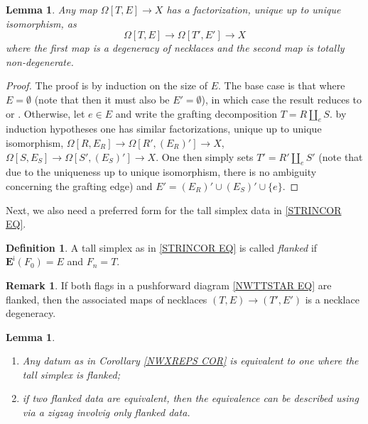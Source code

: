 \documentclass[a4paper,10pt
,draft
]{article}%
\numberwithin{equation}{section}
\numberwithin{figure}{section}
\newtheorem{lemma}[equation]{Lemma}%
\theoremstyle{definition} %
\newtheorem{definition}[equation]{Definition}%
\newtheorem{remark}[equation]{Remark}%
\newcommand{\1}{\ensuremath{\mathbbm 1}}%
\begin{document}
\begin{lemma}\label{DEGNECK LEM}
	Any map 
	$\Omega[T,E] \to X$
	has a factorization, unique up to unique isomorphism, as
\[
	\Omega[T,E] \to \Omega[T',E'] \to X
\]
where the first map is a degeneracy of necklaces
and the second map is totally non-degenerate.
\end{lemma}


\begin{proof}
	The proof is by induction on the size of $E$.
	The base case is that where $E = \emptyset$
	(note that then it must also be $E'=\emptyset$),
	in which case the result reduces to 
	\cite[Prop. 6.9]{CM11} or
	\cite[Prop. 5.62]{Per18}.
	Otherwise, let $e \in E$
	and write the grafting decomposition
	$T = R \amalg_e S$.
	by induction hypotheses one has similar factorizations, unique up to unique isomorphism,
	$\Omega[R,E_R] \to \Omega[R',(E_R)'] \to X$,
	$\Omega[S,E_S] \to \Omega[S',(E_S)'] \to X$.
	One then simply sets 
	$T' = R' \amalg_e S'$
	(note that due to the uniqueness up to unique isomorphism, there is no ambiguity concerning the grafting edge)
	and $E' = (E_R)' \cup (E_S)' \cup \{e\}$.
\end{proof}



Next, we also need a preferred form for the tall simplex data in \eqref{STRINCOR EQ}.



\begin{definition}
	A tall simplex as in 
	\eqref{STRINCOR EQ}
	is called \emph{flanked}
	if $\boldsymbol{E}^{\mathsf{i}}(F_0) = E$
	and $F_n = T$.
\end{definition}


\begin{remark}
	If both flags in a pushforward diagram
	\eqref{NWTTSTAR EQ}
	are flanked,
	then the associated maps of necklaces
	$(T,E) \to (T',E')$
	is a necklace degeneracy.
\end{remark}


\begin{lemma}\label{FLANKING LEM}
	\begin{enumerate}[label=(\roman*)]
	\item Any datum as in Corollary \ref{NWXREPS COR} is equivalent to one where the tall simplex is flanked;
	\item if two flanked data are equivalent, then the equivalence can be described using via a zigzag involvig only flanked data.
	\end{enumerate}
\end{lemma}
\end{document}
